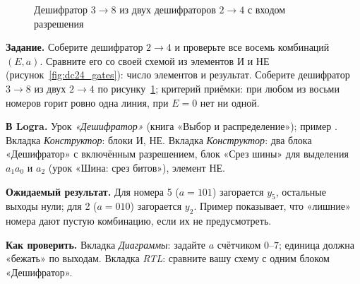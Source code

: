 \begin{figure}[H]
\centering
{}
\caption{Дешифратор $3\to8$ из двух дешифраторов $2\to4$ с входом разрешения}
\label{fig:dc38}
\end{figure}

\begin{diybox}
\textbf{Задание.}  Соберите дешифратор $2\to4$ и проверьте все
восемь комбинаций $(E,a)$.  Сравните его со своей схемой из
элементов И и НЕ (рисунок~\ref{fig:dc24_gates}): число элементов и
результат.  Соберите дешифратор $3\to8$ из двух $2\to4$ по
рисунку~\ref{fig:dc38}; критерий приёмки: при любом из восьми номеров
горит ровно одна линия, при $E=0$ нет ни одной.

\textbf{В Logra.}  Урок \emph{«Дешифратор»} (книга «Выбор и
распределение»); пример .  Вкладка \emph{Конструктор}:
блоки И, НЕ.  Вкладка \emph{Конструктор}: два блока «Дешифратор» с
включённым разрешением, блок «Срез шины» для выделения $a_1a_0$ и $a_2$
(урок «Шина: срез битов»), элемент НЕ.

\textbf{Ожидаемый результат.} Для номера 5 ($a=101$) загорается $y_5$,
остальные выходы нули; для 2 ($a=010$) загорается $y_2$. Пример
 показывает, что «лишние» номера дают пустую
комбинацию, если их не предусмотреть.

\textbf{Как проверить.} Вкладка \emph{Диаграммы}: задайте $a$ счётчиком
$0$--$7$; единица должна «бежать» по выходам. Вкладка \emph{RTL}: сравните
вашу схему с одним блоком «Дешифратор».
\end{diybox}

